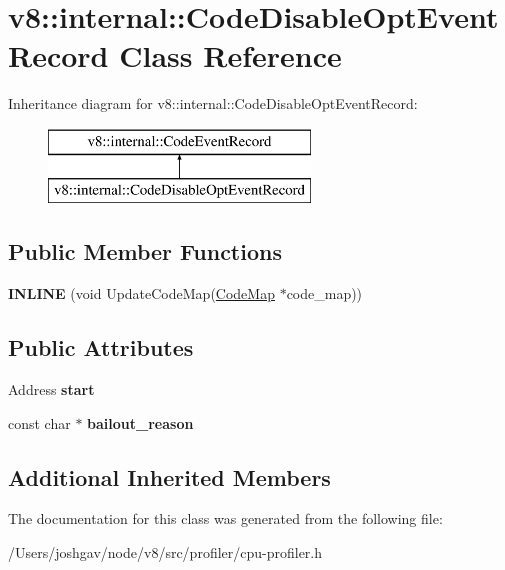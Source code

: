 \hypertarget{classv8_1_1internal_1_1_code_disable_opt_event_record}{}\section{v8\+:\+:internal\+:\+:Code\+Disable\+Opt\+Event\+Record Class Reference}
\label{classv8_1_1internal_1_1_code_disable_opt_event_record}
Inheritance diagram for v8\+:\+:internal\+:\+:Code\+Disable\+Opt\+Event\+Record\+:\begin{figure}[H]
\begin{center}
\leavevmode
\includegraphics[height=2.000000cm]{classv8_1_1internal_1_1_code_disable_opt_event_record}
\end{center}
\end{figure}
\subsection*{Public Member Functions}
\begin{DoxyCompactItemize}
\item 
{\bfseries I\+N\+L\+I\+NE} (void Update\+Code\+Map(\hyperlink{classv8_1_1internal_1_1_code_map}{Code\+Map} $\ast$code\+\_\+map))\hypertarget{classv8_1_1internal_1_1_code_disable_opt_event_record_a70643a3c26f2b4c708182222eb7f705d}{}\label{classv8_1_1internal_1_1_code_disable_opt_event_record_a70643a3c26f2b4c708182222eb7f705d}

\end{DoxyCompactItemize}
\subsection*{Public Attributes}
\begin{DoxyCompactItemize}
\item 
Address {\bfseries start}\hypertarget{classv8_1_1internal_1_1_code_disable_opt_event_record_a8fd92214fb6babcc3550e137fc4bbf7a}{}\label{classv8_1_1internal_1_1_code_disable_opt_event_record_a8fd92214fb6babcc3550e137fc4bbf7a}

\item 
const char $\ast$ {\bfseries bailout\+\_\+reason}\hypertarget{classv8_1_1internal_1_1_code_disable_opt_event_record_a2d72d8a8d6cf252077195aad743bb42d}{}\label{classv8_1_1internal_1_1_code_disable_opt_event_record_a2d72d8a8d6cf252077195aad743bb42d}

\end{DoxyCompactItemize}
\subsection*{Additional Inherited Members}


The documentation for this class was generated from the following file\+:\begin{DoxyCompactItemize}
\item 
/\+Users/joshgav/node/v8/src/profiler/cpu-\/profiler.\+h\end{DoxyCompactItemize}
